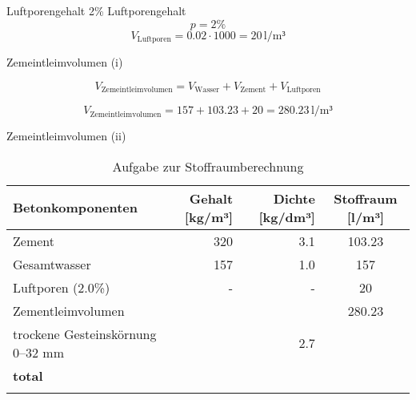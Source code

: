 \begin{frame}{Luftporengehalt}
    2\% Luftporengehalt
    \vspace{1cm}
    \pause
    \begin{equation*}
        p = 2\%
    \end{equation*}
    \pause
    \begin{equation*}
        V_{\text{Luftporen}} = 0.02 \cdot 1000 = 20 \, \text{l/m³}
    \end{equation*}
    
\end{frame}

\begin{frame}{Zemeintleimvolumen (i)}

    \begin{equation*}
        V_{\text{Zemeintleimvolumen}} = V_{\text{Wasser}} + V_{\text{Zement}} + V_{\text{Luftporen}}
    \end{equation*}
    \pause
    
    \begin{equation*}
        V_{\text{Zemeintleimvolumen}} = 157 + 103.23 + 20 = 280.23 \, \text{l/m³}
    \end{equation*}

\end{frame}

\begin{frame}{Zemeintleimvolumen (ii)}
    \begin{table}[h]
        \centering
        \caption{Aufgabe zur Stoffraumberechnung}
        \small
        \begin{tabular}{lrrc}
        \toprule
        \textbf{Betonkomponenten}       & \textbf{Gehalt [kg/m³]} & \textbf{Dichte [kg/dm³]} & \textbf{Stoffraum [l/m³]} \\ 
        \midrule
        Zement                           & 320                      & 3.1                       &    103.23          \\
        Gesamtwasser                     & 157                      & 1.0                       &  157            \\
        Luftporen (2.0\%)                & -                        & -                         & 20              \\
        Zementleimvolumen                &                          &                           & 280.23                          \\
        trockene Gesteinskörnung 0–32 mm & {}                     & 2.7                       & {}           \\
        \textbf{total}                   & {}           &                           & {}             \\
        \bottomrule
        \label{tab:Stoffraumberechnung}
        \end{tabular}
        \end{table}

\end{frame}

